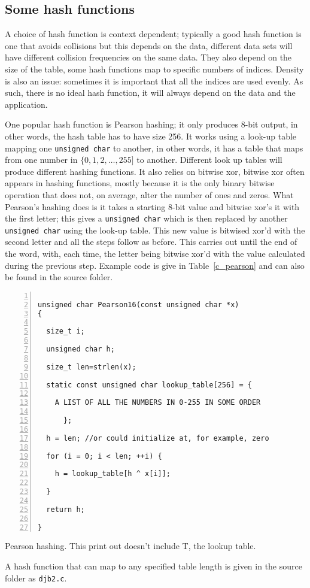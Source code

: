 \documentclass[11pt,a4paper]{scrartcl}
\begin{document}
\subsection*{Some hash functions}

A choice of hash function is context dependent; typically a good hash
function is one that avoids collisions but this depends on the data,
different data sets will have different collision frequencies on the
same data. They also depend on the size of the table, some hash
functions map to specific numbers of indices. Density is also an
issue: sometimes it is important that all the indices are used
evenly. As such, there is no ideal hash function, it will always
depend on the data and the application.

One popular hash function is Pearson hashing; it only produces 8-bit
output, in other words, the hash table has to have size 256. It works
using a look-up table mapping one \texttt{unsigned char} to another,
in other words, it has a table that maps from one number in
$\{0,1,2,\ldots,255]$ to another. Different look up tables will
  produce different hashing functions. It also relies on bitwise xor,
  bitwise xor often appears in hashing functions, mostly because it is
  the only binary bitwise operation that does not, on average, alter
  the number of ones and zeros. What Pearson's hashing does is it
  takes a starting 8-bit value and bitwise xor's it with the first
  letter; this gives a \texttt{unsigned char} which is then replaced
  by another \texttt{unsigned char} using the look-up table. This new
  value is bitwised xor'd with the second letter and all the steps
  follow as before. This carries out until the end of the word, with,
  each time, the letter being bitwise xor'd with the value calculated
  during the previous step. Example code is give in
  Table~\ref{c_pearson} and can also be found in the source folder.

\begin{table}
\begin{lstlisting}[numbers=left]

unsigned char Pearson16(const unsigned char *x) 
{

  size_t i;
  
  unsigned char h;

  size_t len=strlen(x);
  
  static const unsigned char lookup_table[256] = {

    A LIST OF ALL THE NUMBERS IN 0-255 IN SOME ORDER

      };

  h = len; //or could initialize at, for example, zero

  for (i = 0; i < len; ++i) {

    h = lookup_table[h ^ x[i]];

  }

  return h;

}
\end{lstlisting}
\caption{Pearson hashing. This print out doesn't include T, the lookup
  table.\label{c_pearson}}
\end{table}

A hash function that can map to any specified table length is given in the source folder as \texttt{djb2.c}.
\end{document}
